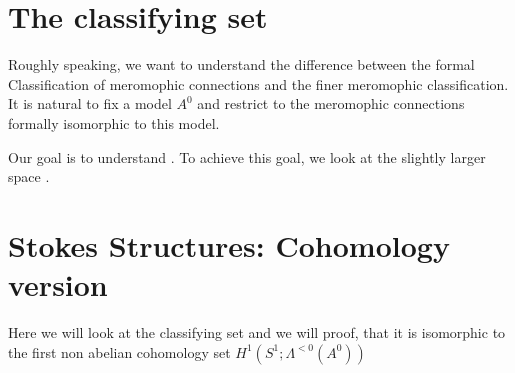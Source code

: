 \section{The classifying set}
\begin{comment}
  \begin{itemize}
    \item \cite{thboalch} p.6
      \begin{itemize}
        \item \cite{boalch} p.19
      \end{itemize}
    \item \cite{Loday1994} p.852
    \item \cite{sabbah2007isomonodromic} p.111
  \end{itemize}
\end{comment}
Roughly speaking, we want to understand the difference between the formal
Classification of meromophic connections and the finer meromophic
classification.
It is natural to fix a model $A^0$ and restrict to the meromophic connections
formally isomorphic to this model.


Our goal is to understand \TODO.
To achieve this goal, we look at the slightly larger space \TODO.

\TODO[Define $\sH$]
\begin{comment} \footnotesize
  \begin{lem}
    The presheaf $\sH$ is a sheaf on $\{0\}$.
  \end{lem}
  \begin{proof}
    See \cite{sabbah2007isomonodromic} lemma II.6.2. 
  \end{proof}
\end{comment}

\begin{comment}
  \TODO: left quotient? $G\backslash\hat G(A_0)$
\end{comment}

\section{Stokes Structures: Cohomology version}
\begin{comment}
  \begin{itemize}
    \item \cite{Loday2014} Thm. 4.3.9, on p. 78
    \item \cite{sabbah2007isomonodromic}
  \end{itemize}  
\end{comment}
Here we will look at the classifying set and we will proof, that it is
isomorphic \TODO[as\dots] to the first non abelian cohomology set
$H^1(S^1;\Lambda^{<0}(A^0))$


